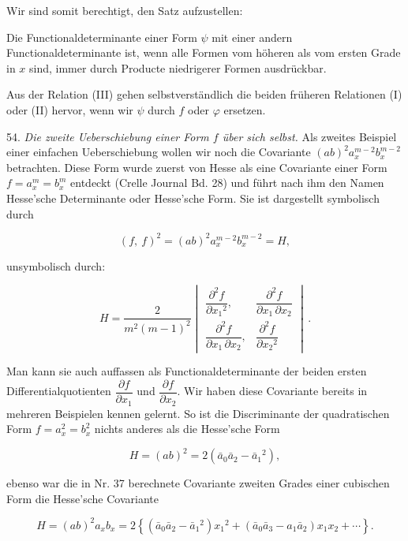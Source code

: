 
Wir sind somit berechtigt, den Satz aufzustellen:

\glqq Die Functionaldeterminante einer Form $\psi$ mit einer andern Functionaldeterminante ist, wenn alle Formen vom höheren als vom ersten Grade in $x$ sind, immer durch Producte niedrigerer Formen ausdrückbar.\grqq{}

Aus der Relation (III) gehen selbstverständlich die beiden früheren Relationen (I) oder (II) hervor, wenn wir $\psi$ durch $f$ oder $\varphi$ ersetzen.


54. \textit{Die zweite Ueberschiebung einer Form $f$ über sich selbst.} Als zweites Beispiel einer einfachen Ueberschiebung wollen wir noch die Covariante $(ab)^2 a_x^{m-2}b_x^{m-2}$ betrachten. Diese Form wurde zuerst von Hesse als eine Covariante einer Form $f = a_x^m = b_x^m$ entdeckt (Crelle Journal Bd. 28) und führt nach ihm den Namen Hesse'sche Determinante oder Hesse'sche Form. Sie ist dargestellt symbolisch durch

\[
(f,\ f)^2 = (ab)^2 a_x^{m-2}b_x^{m-2} = H,
\]

unsymbolisch durch:

\[
H = \frac{2}{m^2(m-1)^2}
\begin{vmatrix}
\dfrac{\partial^2 f}{\partial x_1{}^2}, & \dfrac{\partial^2 f}{\partial x_1\,\partial x_2} \\[2ex]
\dfrac{\partial^2 f}{\partial x_1\,\partial x_2}, & \dfrac{\partial^2 f}{\partial x_2{}^2}
\end{vmatrix}\,.
\]

Man kann sie auch auffassen als Functionaldeterminante der beiden ersten Differentialquotienten $\dfrac{\partial f}{\partial x_1}$ und $\dfrac{\partial f}{\partial x_2}$. Wir haben diese Covariante bereits in mehreren Beispielen kennen gelernt. So ist die Discriminante der quadratischen Form $f = a_x^2 = b_x^2$ nichts anderes als die Hesse'sche Form

\[
H = (ab)^2 = 2(\bar a_0\bar a_2 - \bar a_1{}^2),
\]

ebenso war die in Nr. 37 berechnete Covariante zweiten Grades einer cubischen Form die Hesse'sche Covariante

\[
H = (ab)^2 a_x b_x = 2\left\{(\bar a_0\bar a_2 - \bar a_1{}^2)x_1{}^2 + (\bar a_0\bar a_3 - a_1\bar a_2)x_1 x_2 + \cdots\right\}.
\]


